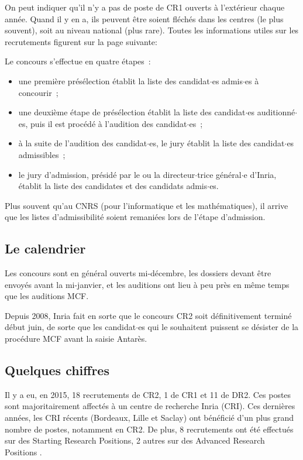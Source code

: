 On peut indiquer qu'il n'y a pas de poste de CR1 ouverts \`a l'ext\'erieur chaque ann\'ee. 
Quand il y en a, ils peuvent \^etre soient fl\'ech\'es dans les centres (le plus souvent), 
soit au niveau national (plus rare). 
Toutes les informations utiles sur les recrutements figurent sur la
page suivante:


Le concours s'effectue en quatre \'etapes~:
\begin{itemize}
\item une premi\`ere pr\'es\'election \'etablit la liste des candidat$\cdot$es admis$\cdot$es \`a
concourir~;
\item une deuxi\`eme \'etape de pr\'es\'election \'etablit la liste des candidat$\cdot$es
auditionn\'e$\cdot$es, puis il est proc\'ed\'e \`a l'audition des candidat$\cdot$es~;
\item \`a la suite de l'audition des candidat$\cdot$es, le jury \'etablit la
liste des candidat$\cdot$es admissibles~;
\item le jury d'admission, pr\'esid\'e par le ou la directeur$\cdot$trice g\'en\'eral$\cdot$e d'Inria, \'etablit la liste des candidates et des candidats admis$\cdot$es.
\end{itemize}
Plus souvent qu'au CNRS (pour l'informatique et les math\'ematiques), il arrive que les listes d'admissibilit\'e soient 
remani\'ees lors de l'\'etape d'admission.

\subsection{Le calendrier}
Les concours sont en g\'en\'eral ouverts mi-d\'ecembre, les dossiers
devant \^etre envoy\'es avant la mi-janvier, et les auditions ont lieu \`a peu pr\`es
en m\^eme temps que les auditions MCF.

Depuis 2008, Inria fait en sorte que le concours CR2 soit
d\'efinitivement termin\'e d\'ebut juin, de sorte que les candidat$\cdot$es
qui le souhaitent puissent se d\'esister de la proc\'edure MCF avant
la saisie Antar\`es.

\subsection{Quelques chiffres}
Il y a eu, en 2015, 18 recrutements de CR2, 1 de CR1 et 11 de DR2. 
Ces postes sont majoritairement affect\'es \`a un centre de recherche Inria (CRI).
Ces derni\`eres ann\'ees, les
CRI r\'ecents (Bordeaux, Lille et Saclay) ont b\'en\'efici\'e d'un
plus grand nombre de postes, notamment en CR2.  De plus, 8 recrutements ont \'et\'e effectu\'es sur des \og Starting Research Positions\fg, 2 autres sur des \og Advanced Research Positions \fg.

